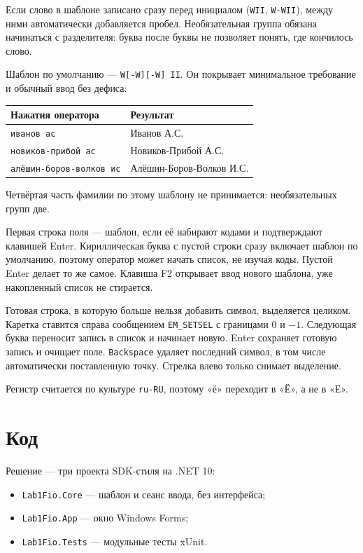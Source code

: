 \documentclass[a4paper,14pt]{extarticle}
\begin{document}
Если слово в шаблоне записано сразу перед инициалом (\texttt{WII}, \texttt{W-WII}), между ними автоматически добавляется пробел. Необязательная группа обязана начинаться с разделителя: буква после буквы не позволяет понять, где кончилось слово.

Шаблон по умолчанию --- \texttt{W[-W][-W] II}. Он покрывает минимальное требование и обычный ввод без дефиса:

\begin{center}
\begin{tabular}{ll}
\toprule
Нажатия оператора & Результат\\
\midrule
\texttt{иванов ас} & Иванов А.С.\\
\texttt{новиков-прибой ас} & Новиков-Прибой А.С.\\
\texttt{алёшин-боров-волков ис} & Алёшин-Боров-Волков И.С.\\
\bottomrule
\end{tabular}
\end{center}

Четвёртая часть фамилии по этому шаблону не принимается: необязательных групп две.

Первая строка поля --- шаблон, если её набирают кодами и подтверждают клавишей Enter. Кириллическая буква с пустой строки сразу включает шаблон по умолчанию, поэтому оператор может начать список, не изучая коды. Пустой Enter делает то же самое. Клавиша F2 открывает ввод нового шаблона, уже накопленный список не стирается.

Готовая строка, в которую больше нельзя добавить символ, выделяется целиком. Каретка ставится справа сообщением \texttt{EM\_SETSEL} с границами 0 и $-1$. Следующая буква переносит запись в список и начинает новую. Enter сохраняет готовую запись и очищает поле. \texttt{Backspace} удаляет последний символ, в том числе автоматически поставленную точку. Стрелка влево только снимает выделение.

Регистр считается по культуре \texttt{ru-RU}, поэтому «ё» переходит в «Ё», а не в «Е».

\section{Код}

Решение --- три проекта SDK-стиля на .NET 10:

\begin{itemize}
\item \texttt{Lab1Fio.Core} --- шаблон и сеанс ввода, без интерфейса;
\item \texttt{Lab1Fio.App} --- окно Windows Forms;
\item \texttt{Lab1Fio.Tests} --- модульные тесты xUnit.
\end{itemize}
\end{document}
